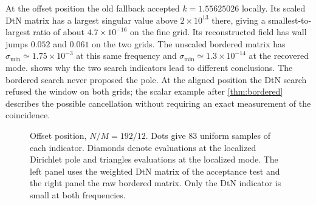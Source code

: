 At the offset position the old fallback accepted $k=1.55625026$ locally.
Its scaled DtN matrix has a largest singular value above $2\times10^{13}$
there, giving a smallest-to-largest ratio of about $4.7\times10^{-16}$ on
the fine grid. Its reconstructed field has wall jumps $0.052$ and $0.061$
on the two grids. The unscaled bordered matrix has
$\sigma_{\min}\simeq1.75\times10^{-3}$ at this same frequency and
$\sigma_{\min}\simeq1.3\times10^{-14}$ at the recovered mode.
 shows why the two search indicators lead to different
conclusions. The bordered search never proposed the pole. At the aligned
position the DtN search refused the window on both grids; the scalar
example after \cref{thm:bordered} describes the possible cancellation
without requiring an exact measurement of the coincidence.

\begin{figure}[htbp]
\centering
{}
\hfill
{}
\caption{Offset position, $N/M=192/12$. Dots give 83 uniform samples
of each indicator. Diamonds denote evaluations at the localized Dirichlet
pole and triangles evaluations at the localized mode. The left panel uses
the weighted DtN matrix of the acceptance test and the right panel the
raw bordered matrix. Only the DtN indicator is small at both frequencies.}
\label{fig:pole-scan}
\end{figure}

